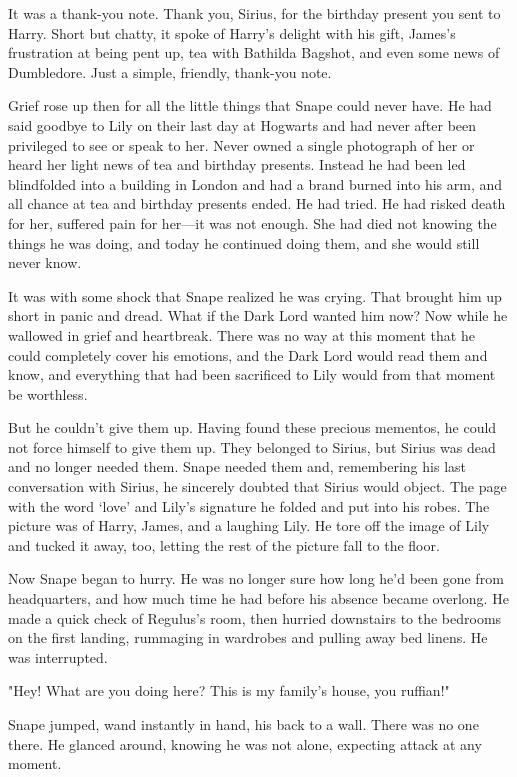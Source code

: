 It was a thank-you note. Thank you, Sirius, for the birthday present you sent to Harry. Short but chatty, it spoke of Harry's delight with his gift, James's frustration at being pent up, tea with Bathilda Bagshot, and even some news of Dumbledore. Just a simple, friendly, thank-you note.

Grief rose up then for all the little things that Snape could never have. He had said goodbye to Lily on their last day at Hogwarts and had never after been privileged to see or speak to her. Never owned a single photograph of her or heard her light news of tea and birthday presents. Instead he had been led blindfolded into a building in London and had a brand burned into his arm, and all chance at tea and birthday presents ended. He had tried. He had risked death for her, suffered pain for her—it was not enough. She had died not knowing the things he was doing, and today he continued doing them, and she would still never know.

It was with some shock that Snape realized he was crying. That brought him up short in panic and dread. What if the Dark Lord wanted him now? Now while he wallowed in grief and heartbreak. There was no way at this moment that he could completely cover his emotions, and the Dark Lord would read them and know, and everything that had been sacrificed to Lily would from that moment be worthless.

But he couldn't give them up. Having found these precious mementos, he could not force himself to give them up. They belonged to Sirius, but Sirius was dead and no longer needed them. Snape needed them and, remembering his last conversation with Sirius, he sincerely doubted that Sirius would object. The page with the word `love' and Lily's signature he folded and put into his robes. The picture was of Harry, James, and a laughing Lily. He tore off the image of Lily and tucked it away, too, letting the rest of the picture fall to the floor.

Now Snape began to hurry. He was no longer sure how long he'd been gone from headquarters, and how much time he had before his absence became overlong. He made a quick check of Regulus's room, then hurried downstairs to the bedrooms on the first landing, rummaging in wardrobes and pulling away bed linens. He was interrupted.

"Hey! What are you doing here? This is my family's house, you ruffian!"

Snape jumped, wand instantly in hand, his back to a wall. There was no one there. He glanced around, knowing he was not alone, expecting attack at any moment.

